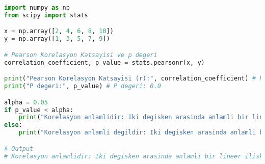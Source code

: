 \begin{lstlisting}[language=Python]
import numpy as np
from scipy import stats

x = np.array([2, 4, 6, 8, 10])
y = np.array([1, 3, 5, 7, 9])

# Pearson Korelasyon Katsayisi ve p degeri
correlation_coefficient, p_value = stats.pearsonr(x, y)

print("Pearson Korelasyon Katsayisi (r):", correlation_coefficient) # Pearson Korelasyon Katsayisi (r): 1.0
print("P degeri:", p_value) # P degeri: 0.0

alpha = 0.05
if p_value < alpha:
    print("Korelasyon anlamlidir: Iki degisken arasinda anlamli bir lineer iliski vardir.")
else:
    print("Korelasyon anlamli degildir: Iki degisken arasinda anlamli bir lineer iliski yoktur.")

# Output
# Korelasyon anlamlidir: Iki degisken arasinda anlamli bir lineer iliski vardir.
\end{lstlisting}

\newpage